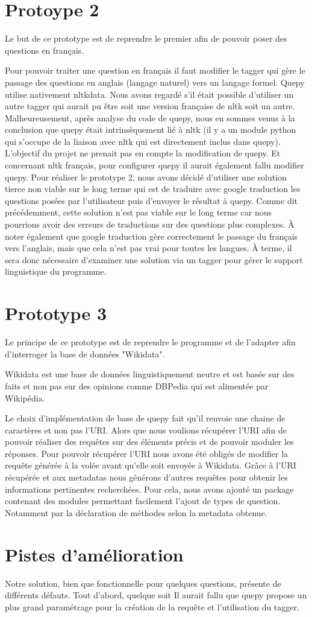 \documentclass[11pt,a4paper]{article}
\begin{document}
\section*{Protoype 2}\par
Le but de ce prototype est de reprendre le premier afin de pouvoir poser des questions en français.\par
Pour pouvoir traiter une question en français il faut modifier le tagger qui gère le passage des questions en anglais (langage naturel) vers un langage formel. 
Quepy utilise nativement nltkdata. Nous avons regardé s’il était possible d’utiliser un autre tagger qui aurait pu être soit une version française de nltk soit un autre. 
Malheureusement, après analyse du code de quepy, nous en sommes venus à la conclusion que quepy était intrinsèquement lié à nltk (il y a un module python qui s’occupe de la liaison avec nltk qui est directement inclus dans quepy). 
L’objectif du projet ne prenait pas en compte la modification de quepy. Et concernant nltk français, pour configurer quepy il aurait également fallu modifier quepy. 
Pour réaliser le prototype 2, nous avons décidé d’utiliser une solution tierce non viable sur le long terme qui est de traduire avec google traduction les questions posées par l’utilisateur puis d’envoyer le résultat à quepy. 
Comme dit précédemment, cette solution n’est pas viable sur le long terme car nous pourrions avoir des erreurs de traductions sur des questions plus complexes. 
À noter également que google traduction gère correctement le passage du français vers l’anglais, mais que cela n’est pas vrai pour toutes les langues. 
À terme, il sera donc nécessaire d’examiner une solution via un tagger pour gérer le support linguistique du programme. 

\section*{Prototype 3}\par
Le principe de ce prototype est de reprendre le programme et de l’adapter afin d’interroger la base de données "Wikidata".

Wikidata est une base de données linguistiquement neutre et est basée sur des faits et non pas sur des opinions comme DBPedia qui est alimentée par Wikipédia.\par
Le choix d’implémentation de base de quepy fait qu’il renvoie une chaine de caractères et non pas l’URI. Alors que nous voulions récupérer l’URI afin de pouvoir réaliser des requêtes sur des éléments précis et de pouvoir moduler les réponses.
Pour pouvoir récupérer l’URI nous avons été obligés de modifier la requête générée à la volée avant qu’elle soit envoyée à Wikidata. 
Grâce à l’URI récupérée et aux metadatas nous générons d’autres requêtes pour obtenir les informations pertinentes recherchées.
Pour cela, nous avons ajouté un package contenant des modules permettant facilement l’ajout de types de question. Notamment par la déclaration de méthodes selon la metadata obtenue.\par

\section*{Pistes d'amélioration}
Notre solution, bien que fonctionnelle pour quelques questions, présente de différents défauts. Tout d'abord, quelque soit Il aurait fallu que quepy propose un plus grand paramétrage pour la création de la requête et l’utilisation du tagger.
\end{document}
